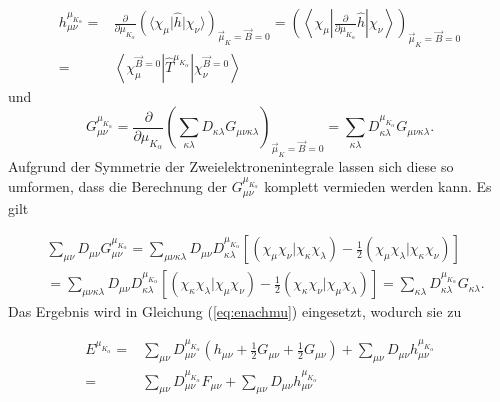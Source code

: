      \begin{equation}\label{eq:hmukelemente}
     \begin{aligned}
       h_{\mu\nu}^{\mu_{K_\alpha}}=&\frac{\partial}{\partial \mu_{K_\alpha}}\left(\langle\chi_\mu\vert\hat{h}\vert\chi_\nu\rangle\right)_{\vec{\mu}_K=\vec{B}=0}=\left(\left\langle\chi_\mu\left\vert\frac{\partial}{\partial \mu_{K_\alpha}}\hat{h}\right\vert\chi_\nu\right\rangle\right)_{\vec{\mu}_K=\vec{B}=0}\\
       =&\left\langle\chi_\mu^{\vec{B}=0}\left\vert\hat{T}^{\mu_{K_\alpha}}\right\vert\chi_\nu^{\vec{B}=0}\right\rangle
     \end{aligned}
     \end{equation}
     und 
     \begin{equation}
      G_{\mu\nu}^{\mu_{K_\alpha}}= \frac{\partial}{\partial\mu_{K_\alpha}} \left(\sum_{\kappa\lambda}D_{\kappa\lambda}G_{\mu\nu\kappa\lambda}\right)_{\vec{\mu}_K=\vec{B}=0}=\sum_{\kappa\lambda}D_{\kappa\lambda}^{\mu_{K_\alpha}}G_{\mu\nu\kappa\lambda}.
     \end{equation}
     Aufgrund der Symmetrie der Zweielektronenintegrale lassen sich diese so umformen, dass die Berechnung der $G_{\mu\nu}^{\mu_{K_\alpha}}$ komplett vermieden werden kann. Es gilt
     
     \begin{equation}
     \begin{aligned}
     &\sum_{\mu\nu}D_{\mu\nu}G_{\mu\nu}^{\mu_{K_\alpha}}=\sum_{\mu\nu\kappa\lambda}D_{\mu\nu}D_{\kappa\lambda}^{\mu_{K_\alpha}}\left[(\chi_\mu\chi_\nu\vert\chi_\kappa\chi_\lambda)-\frac{1}{2}(\chi_\mu\chi_\lambda\vert\chi_\kappa\chi_\nu)\right]\\
     &=\sum_{\mu\nu\kappa\lambda}D_{\mu\nu}D_{\kappa\lambda}^{\mu_{K_\alpha}}\left[(\chi_\kappa\chi_\lambda\vert\chi_\mu\chi_\nu)-\frac{1}{2}(\chi_\kappa\chi_\nu\vert\chi_\mu\chi_\lambda)\right]=\sum_{\kappa\lambda}D_{\kappa\lambda}^{\mu_{K_\alpha}}G_{\kappa\lambda}.
     \end{aligned}
     \end{equation}
     Das Ergebnis wird in Gleichung (\ref{eq:enachmu}) eingesetzt, wodurch sie zu

	\begin{equation}
    \begin{aligned}
	  E^{\mu_{K_\alpha}}=&\sum_{\mu\nu}D_{\mu\nu}^{\mu_{K_\alpha}}(h_{\mu\nu}+\frac{1}{2}G_{\mu\nu}+\frac{1}{2}G_{\mu\nu})+\sum_{\mu\nu}D_{\mu\nu}h_{\mu\nu}^{\mu_{K_\alpha}}\\
	  =&\sum_{\mu\nu}D_{\mu\nu}^{\mu_{K_\alpha}}F_{\mu\nu}+\sum_{\mu\nu}D_{\mu\nu}h_{\mu\nu}^{\mu_{K_\alpha}}
    \end{aligned}
	\end{equation}     
     
